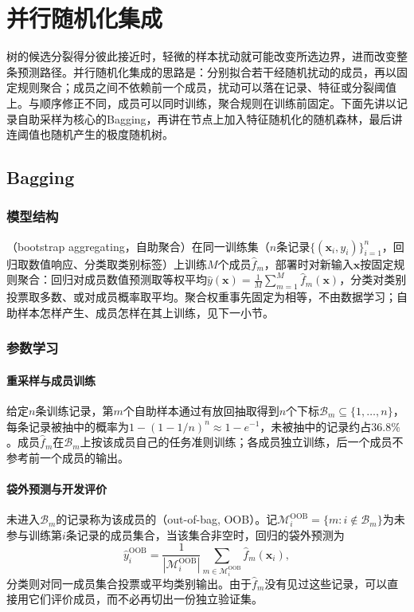 \section{并行随机化集成}
\label{sec:ensemble-bagging}

树的候选分裂得分彼此接近时，轻微的样本扰动就可能改变所选边界，进而改变整条预测路径。并行随机化集成的思路是：分别拟合若干经随机扰动的成员，再以固定规则聚合；成员之间不依赖前一个成员，扰动可以落在记录、特征或分裂阈值上。与顺序修正不同，成员可以同时训练，聚合规则在训练前固定。下面先讲以记录自助采样为核心的Bagging，再讲在节点上加入特征随机化的随机森林，最后讲连阈值也随机产生的极度随机树。

\subsection{Bagging}
\label{sec:ensemble-bagging-bootstrap}

\subsubsection{模型结构}
（bootstrap aggregating，自助聚合）在同一训练集（$n$条记录$\{(\bm x_i,y_i)\}_{i=1}^n$，回归取数值响应、分类取类别标签）上训练$M$个成员$\hat f_m$，部署时对新输入$\bm x$按固定规则聚合：回归对成员数值预测取等权平均$\hat y(\bm x)=\frac1M\sum_{m=1}^M\hat f_m(\bm x)$，分类对类别投票取多数、或对成员概率取平均。聚合权重事先固定为相等，不由数据学习；自助样本怎样产生、成员怎样在其上训练，见下一小节。

\subsubsection{参数学习}

\paragraph{重采样与成员训练}
给定$n$条训练记录，第$m$个自助样本通过有放回抽取得到$n$个下标$\mathcal B_m\subseteq\{1,\ldots,n\}$，每条记录被抽中的概率为$1-(1-1/n)^n\approx1-e^{-1}$，未被抽中的记录约占$36.8\%$。成员$\hat f_m$在$\mathcal B_m$上按该成员自己的任务准则训练；各成员独立训练，后一个成员不参考前一个成员的输出。

\paragraph{袋外预测与开发评价}
未进入$\mathcal B_m$的记录称为该成员的（out-of-bag, OOB）。记$\mathcal M_i^{\mathrm{OOB}}=\{m:i\notin\mathcal B_m\}$为未参与训练第$i$条记录的成员集合，当该集合非空时，回归的袋外预测为
\begin{equation}
  \hat y_i^{\mathrm{OOB}}
  =\frac{1}{|\mathcal M_i^{\mathrm{OOB}}|}
  \sum_{m\in\mathcal M_i^{\mathrm{OOB}}}\hat f_m(\bm x_i),
  \label{eq:ensemble-oob-prediction}
\end{equation}
分类则对同一成员集合投票或平均类别输出。由于$\hat f_m$没有见过这些记录，可以直接用它们评价成员，而不必再切出一份独立验证集。

